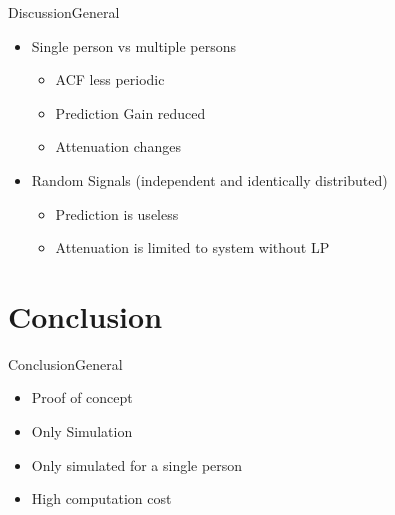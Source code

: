 

	













\begin{frame}{Discussion}{General}		
\begin{itemize}
	\item Single person vs multiple persons
	\begin{itemize}
		\item ACF less periodic
		\item Prediction Gain reduced
		\item Attenuation changes
	\end{itemize}
	\item Random Signals (independent and identically distributed)
	\begin{itemize}
		\item Prediction is useless
		\item Attenuation is limited to system without LP
	\end{itemize}
\end{itemize}
\end{frame}

\section{Conclusion}
\begin{frame}{Conclusion}{General}		
\begin{itemize}
	\item Proof of concept
	\item Only Simulation
	\item Only simulated for a single person
	\item High computation cost
\end{itemize}
\end{frame}

